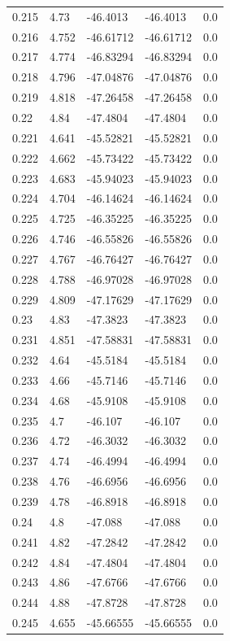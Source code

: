 \begin{tabular}{lllll}
0.215 & 4.73 & -46.4013 & -46.4013 & 0.0 \\
0.216 & 4.752 & -46.61712 & -46.61712 & 0.0 \\
0.217 & 4.774 & -46.83294 & -46.83294 & 0.0 \\
0.218 & 4.796 & -47.04876 & -47.04876 & 0.0 \\
0.219 & 4.818 & -47.26458 & -47.26458 & 0.0 \\
0.22 & 4.84 & -47.4804 & -47.4804 & 0.0 \\
0.221 & 4.641 & -45.52821 & -45.52821 & 0.0 \\
0.222 & 4.662 & -45.73422 & -45.73422 & 0.0 \\
0.223 & 4.683 & -45.94023 & -45.94023 & 0.0 \\
0.224 & 4.704 & -46.14624 & -46.14624 & 0.0 \\
0.225 & 4.725 & -46.35225 & -46.35225 & 0.0 \\
0.226 & 4.746 & -46.55826 & -46.55826 & 0.0 \\
0.227 & 4.767 & -46.76427 & -46.76427 & 0.0 \\
0.228 & 4.788 & -46.97028 & -46.97028 & 0.0 \\
0.229 & 4.809 & -47.17629 & -47.17629 & 0.0 \\
0.23 & 4.83 & -47.3823 & -47.3823 & 0.0 \\
0.231 & 4.851 & -47.58831 & -47.58831 & 0.0 \\
0.232 & 4.64 & -45.5184 & -45.5184 & 0.0 \\
0.233 & 4.66 & -45.7146 & -45.7146 & 0.0 \\
0.234 & 4.68 & -45.9108 & -45.9108 & 0.0 \\
0.235 & 4.7 & -46.107 & -46.107 & 0.0 \\
0.236 & 4.72 & -46.3032 & -46.3032 & 0.0 \\
0.237 & 4.74 & -46.4994 & -46.4994 & 0.0 \\
0.238 & 4.76 & -46.6956 & -46.6956 & 0.0 \\
0.239 & 4.78 & -46.8918 & -46.8918 & 0.0 \\
0.24 & 4.8 & -47.088 & -47.088 & 0.0 \\
0.241 & 4.82 & -47.2842 & -47.2842 & 0.0 \\
0.242 & 4.84 & -47.4804 & -47.4804 & 0.0 \\
0.243 & 4.86 & -47.6766 & -47.6766 & 0.0 \\
0.244 & 4.88 & -47.8728 & -47.8728 & 0.0 \\
0.245 & 4.655 & -45.66555 & -45.66555 & 0.0 \\

\end{tabular}
